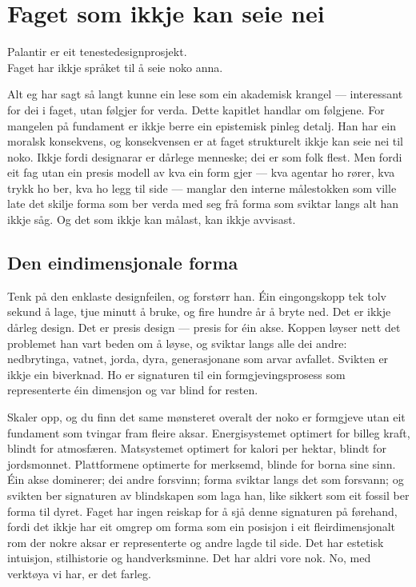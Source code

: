 \chapter{Faget som ikkje kan seie nei}

\begin{motto}
Palantir er eit tenestedesignprosjekt.\\ Faget har ikkje språket til å seie noko anna.
\end{motto}

Alt eg har sagt så langt kunne ein lese som ein akademisk krangel — interessant for dei i faget, utan følgjer for verda. Dette kapitlet handlar om følgjene. For mangelen på fundament er ikkje berre ein epistemisk pinleg detalj. Han har ein moralsk konsekvens, og konsekvensen er at faget strukturelt ikkje kan seie nei til noko. Ikkje fordi designarar er dårlege menneske; dei er som folk flest. Men fordi eit fag utan ein presis modell av kva ein form gjer — kva agentar ho rører, kva trykk ho ber, kva ho legg til side — manglar den interne målestokken som ville late det skilje forma som ber verda med seg frå forma som sviktar langs alt han ikkje såg. Og det som ikkje kan målast, kan ikkje avvisast.

\section{Den eindimensjonale forma}

Tenk på den enklaste designfeilen, og forstørr han. Éin eingongskopp tek tolv sekund å lage, tjue minutt å bruke, og fire hundre år å bryte ned. Det er ikkje dårleg design. Det er presis design — presis for éin akse. Koppen løyser nett det problemet han vart beden om å løyse, og sviktar langs alle dei andre: nedbrytinga, vatnet, jorda, dyra, generasjonane som arvar avfallet. Svikten er ikkje ein biverknad. Ho er signaturen til ein formgjevingsprosess som representerte éin dimensjon og var blind for resten.

Skaler opp, og du finn det same mønsteret overalt der noko er formgjeve utan eit fundament som tvingar fram fleire aksar. Energisystemet optimert for billeg kraft, blindt for atmosfæren. Matsystemet optimert for kalori per hektar, blindt for jordsmonnet. Plattformene optimerte for merksemd, blinde for borna sine sinn. Éin akse dominerer; dei andre forsvinn; forma sviktar langs det som forsvann; og svikten ber signaturen av blindskapen som laga han, like sikkert som eit fossil ber forma til dyret. Faget har ingen reiskap for å sjå denne signaturen på førehand, fordi det ikkje har eit omgrep om forma som ein posisjon i eit fleirdimensjonalt rom der nokre aksar er representerte og andre lagde til side. Det har estetisk intuisjon, stilhistorie og handverksminne. Det har aldri vore nok. No, med verktøya vi har, er det farleg.

